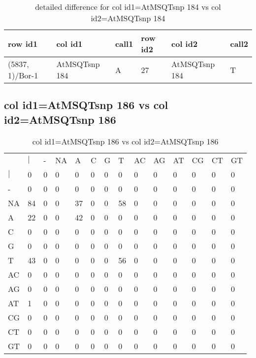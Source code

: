 \begin{center}
\begin{longtable}{|l|l|l|l|l|l|}
\caption{detailed difference for col id1=AtMSQTsnp 184 vs col id2=AtMSQTsnp 184} \label{table_dm755}\\
\hline
row id1&col id1&call1&row id2&col id2&call2\\
\hline
(5837, 1)/Bor-1&AtMSQTsnp 184&A&27&AtMSQTsnp 184&T\\
\hline
\end{longtable}
\end{center}

\subsection{col id1=AtMSQTsnp 186 vs col id2=AtMSQTsnp 186}
\begin{center}
\begin{longtable}{|l|l|l|l|l|l|l|l|l|l|l|l|l|l|}
\caption{col id1=AtMSQTsnp 186 vs col id2=AtMSQTsnp 186} \label{table_dm756}\\
\hline
\\
\hline
&$|$&-&NA&A&C&G&T&AC&AG&AT&CG&CT&GT\\
$|$&0&0&0&0&0&0&0&0&0&0&0&0&0\\
-&0&0&0&0&0&0&0&0&0&0&0&0&0\\
NA&84&0&0&37&0&0&58&0&0&0&0&0&0\\
A&22&0&0&42&0&0&0&0&0&0&0&0&0\\
C&0&0&0&0&0&0&0&0&0&0&0&0&0\\
G&0&0&0&0&0&0&0&0&0&0&0&0&0\\
T&43&0&0&0&0&0&56&0&0&0&0&0&0\\
AC&0&0&0&0&0&0&0&0&0&0&0&0&0\\
AG&0&0&0&0&0&0&0&0&0&0&0&0&0\\
AT&1&0&0&0&0&0&0&0&0&0&0&0&0\\
CG&0&0&0&0&0&0&0&0&0&0&0&0&0\\
CT&0&0&0&0&0&0&0&0&0&0&0&0&0\\
GT&0&0&0&0&0&0&0&0&0&0&0&0&0\\
\hline
\end{longtable}
\end{center}

